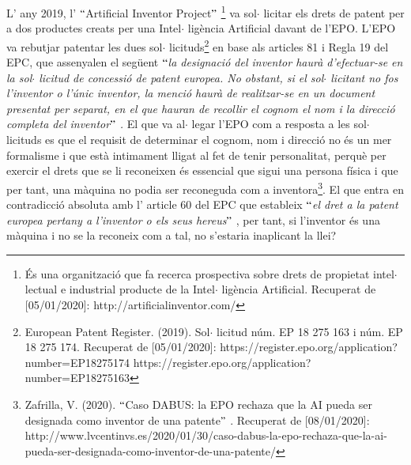\documentclass[12pt]{article}
\begin{document}
\begin{justify}
L’ any 2019, l’ $``$Artificial Inventor Project$"$  \footnote{ És una organització que fa recerca prospectiva sobre drets de propietat intel$ \cdot $ lectual e industrial producte de la Intel$ \cdot $ ligència Artificial. Recuperat de [05/01/2020]: http://artificialinventor.com/ } va sol$ \cdot $ licitar els drets de patent per a dos productes creats per una Intel$ \cdot $ ligència Artificial davant de l’EPO. L’EPO va rebutjar patentar les dues sol$ \cdot $ licituds\footnote{ European Patent Register. (2019). Sol$ \cdot $ licitud núm. EP 18 275 163 i núm. EP 18 275 174. Recuperat de [05/01/2020]: https://register.epo.org/application?number=EP18275174 https://register.epo.org/application?number=EP18275163 } en base als articles 81 i Regla 19 del EPC, que assenyalen el següent $``$\textit{la designació del inventor haurà d’efectuar-se en la sol$ \cdot $ licitud de concessió de patent europea. No obstant, si el sol$ \cdot $ licitant no fos l’inventor o l’únic inventor, la menció haurà de realitzar-se en un document presentat per separat, en el que hauran de recollir el cognom el nom i la direcció completa del inventor$"$ . }El que va al$ \cdot $ legar l’EPO com a resposta a les sol$ \cdot $ licituds es que el requisit de determinar el cognom, nom i direcció no és un mer formalisme i que està intimament lligat al fet de tenir personalitat, perquè per exercir el drets que se li reconeixen és essencial que sigui una persona física i que per tant, una màquina no podia ser reconeguda com a inventora\footnote{ Zafrilla, V. (2020). $``$Caso DABUS: la EPO rechaza que la AI pueda ser designada como inventor de una patente$"$ . Recuperat de [08/01/2020]: http://www.lvcentinvs.es/2020/01/30/caso-dabus-la-epo-rechaza-que-la-ai-pueda-ser-designada-como-inventor-de-una-patente/ }. El que entra en contradicció absoluta amb l’ article 60 del EPC que estableix $``$\textit{el dret a la patent europea pertany a l’inventor o els seus hereus$"$ }, per tant, si l’inventor és una màquina i no se la reconeix com a tal, no s’estaria inaplicant la llei?  
\end{justify}\par
\end{document}
